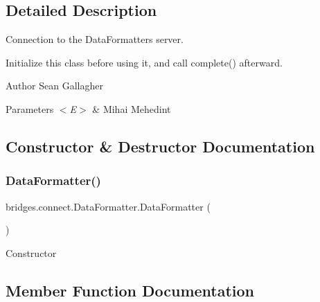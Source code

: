 \subsection{Detailed Description}
Connection to the Data\+Formatters server.

Initialize this class before using it, and call complete() afterward.

\begin{DoxyAuthor}{Author}
Sean Gallagher 
\end{DoxyAuthor}

\begin{DoxyParams}{Parameters}
{\em $<$\+E$>$} & Mihai Mehedint \\
\hline
\end{DoxyParams}


\subsection{Constructor \& Destructor Documentation}
\hypertarget{classbridges_1_1connect_1_1_data_formatter_a31efd2251e98942e58e743dff213ef27}{}\label{classbridges_1_1connect_1_1_data_formatter_a31efd2251e98942e58e743dff213ef27} 
\subsubsection{\texorpdfstring{Data\+Formatter()}{DataFormatter()}}
{\footnotesize\ttfamily bridges.\+connect.\+Data\+Formatter.\+Data\+Formatter (\begin{DoxyParamCaption}{ }\end{DoxyParamCaption})\hspace{0.3cm}{\ttfamily [protected]}}

Constructor 

\subsection{Member Function Documentation}
\hypertarget{classbridges_1_1connect_1_1_data_formatter_ad87ca06456fa4dc110e167e84f2d4447}{}\label{classbridges_1_1connect_1_1_data_formatter_ad87ca06456fa4dc110e167e84f2d4447} 
